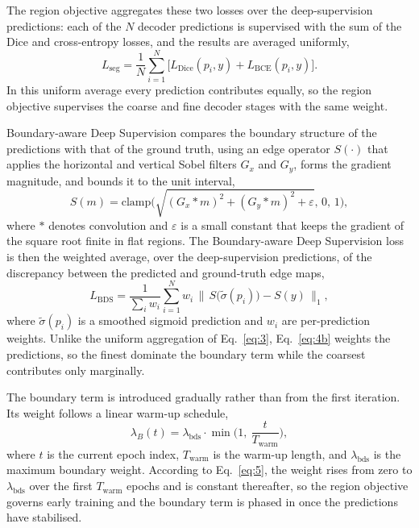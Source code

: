The region objective aggregates these two losses over the deep-supervision predictions: each of the $N$ decoder predictions is supervised with the sum of the Dice and cross-entropy losses, and the results are averaged uniformly,
\begin{equation}
L_{\mathrm{seg}} = \frac{1}{N}\sum_{i=1}^{N}\Big[L_{\mathrm{Dice}}(p_i,y) + L_{\mathrm{BCE}}(p_i,y)\Big]. \tag{3}
\label{eq:3}
\end{equation}
In this uniform average every prediction contributes equally, so the region objective supervises the coarse and fine decoder stages with the same weight.

Boundary-aware Deep Supervision compares the boundary structure of the predictions with that of the ground truth, using an edge operator $S(\cdot)$ that applies the horizontal and vertical Sobel filters $G_x$ and $G_y$, forms the gradient magnitude, and bounds it to the unit interval,
\begin{equation}
S(m) = \mathrm{clamp}\!\Big(\sqrt{(G_x * m)^2 + (G_y * m)^2 + \varepsilon},\,0,\,1\Big), \tag{4a}
\label{eq:4a}
\end{equation}
where $*$ denotes convolution and $\varepsilon$ is a small constant that keeps the gradient of the square root finite in flat regions. The Boundary-aware Deep Supervision loss is then the weighted average, over the deep-supervision predictions, of the discrepancy between the predicted and ground-truth edge maps,
\begin{equation}
L_{\mathrm{BDS}} = \frac{1}{\sum_{i}w_i}\sum_{i=1}^{N} w_i \,\big\lVert\, S\big(\tilde{\sigma}(p_i)\big) - S(y)\,\big\rVert_1, \tag{4b}
\label{eq:4b}
\end{equation}
where $\tilde{\sigma}(p_i)$ is a smoothed sigmoid prediction and $w_i$ are per-prediction weights. Unlike the uniform aggregation of Eq.~\eqref{eq:3}, Eq.~\eqref{eq:4b} weights the predictions, so the finest dominate the boundary term while the coarsest contributes only marginally.

The boundary term is introduced gradually rather than from the first iteration. Its weight follows a linear warm-up schedule,
\begin{equation}
\lambda_{B}(t) = \lambda_{\mathrm{bds}}\cdot\min\!\Big(1,\ \frac{t}{T_{\mathrm{warm}}}\Big), \tag{5}
\label{eq:5}
\end{equation}
where $t$ is the current epoch index, $T_{\mathrm{warm}}$ is the warm-up length, and $\lambda_{\mathrm{bds}}$ is the maximum boundary weight. According to Eq.~\eqref{eq:5}, the weight rises from zero to $\lambda_{\mathrm{bds}}$ over the first $T_{\mathrm{warm}}$ epochs and is constant thereafter, so the region objective governs early training and the boundary term is phased in once the predictions have stabilised.

